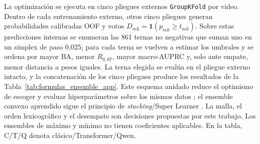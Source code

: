 La optimización se ejecuta en cinco pliegues externos \texttt{GroupKFold} por video. Dentro de cada entrenamiento externo, otros cinco pliegues generan probabilidades calibradas OOF y votos $D_{mk}=\mathbf{1}(p_{mk}\ge t_{mk})$. Sobre estas predicciones internas se enumeran las 861 ternas no negativas que suman uno en un simplex de paso 0,025; para cada terna se vuelven a estimar los umbrales y se ordena por mayor BA, menor $R_{0,67}$, mayor macro-AUPRC y, solo ante empate, menor distancia a pesos iguales. La terna elegida se evalúa en el pliegue externo intacto, y la concatenación de los cinco pliegues produce los resultados de la Tabla~\ref{tab:formulas_ensemble_app}. Este esquema anidado reduce el optimismo de escoger y evaluar hiperparámetros sobre los mismos datos \cite{cawley2010selection}; el ensemble convexo aprendido sigue el principio de \emph{stacking}/Super Learner \cite{wolpert1992stacked,vanderlaan2007superlearner}. La malla, el orden lexicográfico y el desempate son decisiones propuestas por este trabajo. Los ensembles de máximo y mínimo no tienen coeficientes aplicables. En la tabla, C/T/Q denota clásico/Transformer/Qwen.

